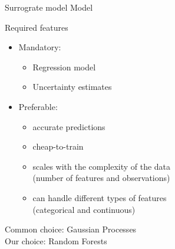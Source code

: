 \begin{frame}[c,fragile]{Surrograte model Model}

Required features

\begin{itemize}
  \item Mandatory:
  \begin{itemize}
    \item Regression model
	\item Uncertainty estimates
  \end{itemize}
  \pause
  \item Preferable:
  \begin{itemize}
    \item accurate predictions
    \item cheap-to-train
    \item scales with the complexity of the data\\ (number of features and observations)
    \item can handle different types of features\\ (categorical and continuous)
  \end{itemize}
\end{itemize}

\pause
Common choice: Gaussian Processes\\
Our choice: Random Forests

\end{frame}


